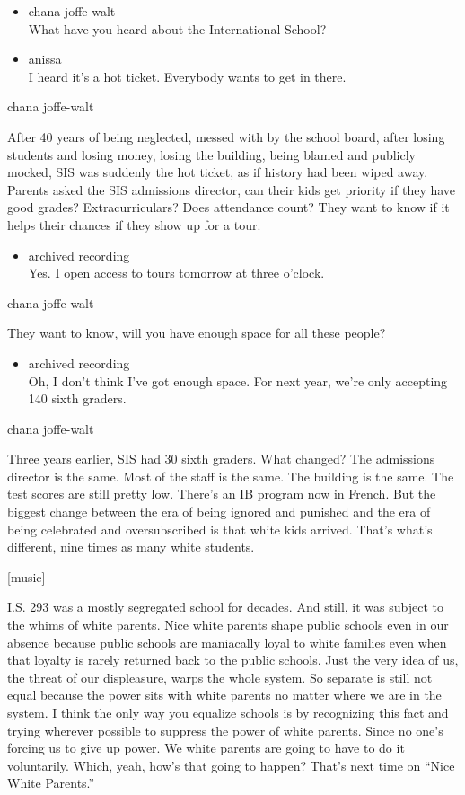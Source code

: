 \begin{itemize}
\item
  chana joffe-walt\\
  What have you heard about the International School?
\item
  anissa\\
  I heard it's a hot ticket. Everybody wants to get in there.
\end{itemize}

chana joffe-walt

After 40 years of being neglected, messed with by the school board,
after losing students and losing money, losing the building, being
blamed and publicly mocked, SIS was suddenly the hot ticket, as if
history had been wiped away. Parents asked the SIS admissions director,
can their kids get priority if they have good grades? Extracurriculars?
Does attendance count? They want to know if it helps their chances if
they show up for a tour.

\begin{itemize}
\tightlist
\item
  archived recording\\
  Yes. I open access to tours tomorrow at three o'clock.
\end{itemize}

chana joffe-walt

They want to know, will you have enough space for all these people?

\begin{itemize}
\tightlist
\item
  archived recording\\
  Oh, I don't think I've got enough space. For next year, we're only
  accepting 140 sixth graders.
\end{itemize}

chana joffe-walt

Three years earlier, SIS had 30 sixth graders. What changed? The
admissions director is the same. Most of the staff is the same. The
building is the same. The test scores are still pretty low. There's an
IB program now in French. But the biggest change between the era of
being ignored and punished and the era of being celebrated and
oversubscribed is that white kids arrived. That's what's different, nine
times as many white students.

{[}music{]}

I.S. 293 was a mostly segregated school for decades. And still, it was
subject to the whims of white parents. Nice white parents shape public
schools even in our absence because public schools are maniacally loyal
to white families even when that loyalty is rarely returned back to the
public schools. Just the very idea of us, the threat of our displeasure,
warps the whole system. So separate is still not equal because the power
sits with white parents no matter where we are in the system. I think
the only way you equalize schools is by recognizing this fact and trying
wherever possible to suppress the power of white parents. Since no one's
forcing us to give up power. We white parents are going to have to do it
voluntarily. Which, yeah, how's that going to happen? That's next time
on ``Nice White Parents.''


